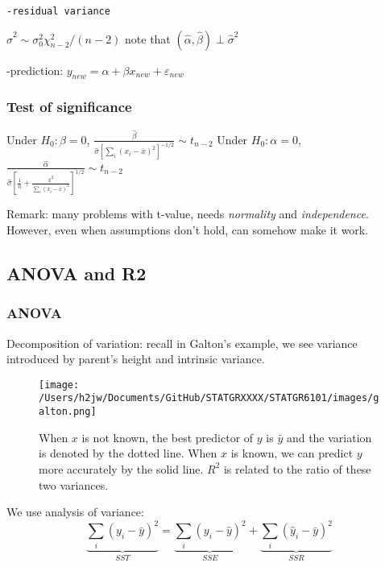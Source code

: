\documentclass[
]{article}
\begin{document}
\begin{verbatim}
-residual variance 
\end{verbatim}

\(\hat{\sigma}^2\sim\sigma_0^2\chi_{n-2}^2/(n-2)\) note that
\((\hat{\alpha},\hat{\beta})\perp\hat{\sigma}^2\)

-prediction: \(y_{new}=\alpha+\beta x_{new}+\varepsilon_{new}\)

\hypertarget{test-of-significance}{%
\subsubsection{Test of significance}\label{test-of-significance}}

Under \(H_0 :\beta=0\),
\(\frac{\hat{\beta}}{\hat{\sigma}[\sum_i (x_i-\bar{x})^2]^{-1/2}}\sim t_{n-2}\)
Under \(H_0 :\alpha=0\),
\(\frac{\hat{\alpha}}{\hat{\sigma}[\frac{1}{n}+\frac{\bar{x}^2}{\sum_i (x_i-\bar{x})^2}]^{1/2}}\sim t_{n-2}\)

Remark: many problems with t-value, needs \emph{normality} and
\emph{independence}. However, even when assumptions don't hold, can
somehow make it work.

\hypertarget{anova-and-r2}{%
\subsection{ANOVA and R2}\label{anova-and-r2}}

\hypertarget{anova}{%
\subsubsection{ANOVA}\label{anova}}

Decomposition of variation: recall in Galton's example, we see variance
introduced by parent's height and intrinsic variance.

\begin{figure}
\centering
\texttt{[image: /Users/h2jw/Documents/GitHub/STATGRXXXX/STATGR6101/images/galton.png]}
\caption{When \(x\) is not known, the best predictor of \(y\) is
\(\bar{y}\) and the variation is denoted by the dotted line. When \(x\)
is known, we can predict \(y\) more accurately by the solid line.
\(R^2\) is related to the ratio of these two variances.}
\end{figure}

We use analysis of variance:
\[\underbrace{\sum_i(y_i-\bar{y})^2}_{SST}=\underbrace{\sum_i(y_i-\hat{y})^2}_{SSE}+\underbrace{\sum_i(\hat{y}_i-\bar{y})^2}_{SSR}\]
\end{document}
